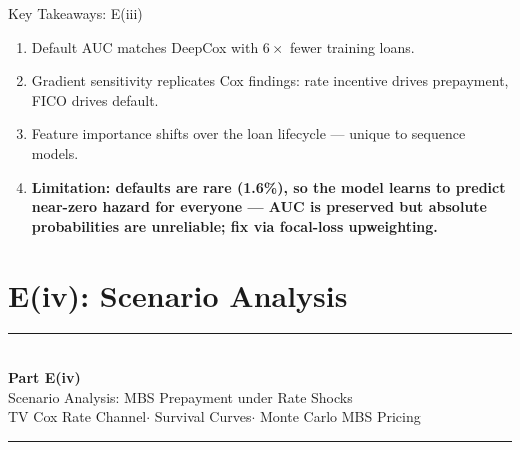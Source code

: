 \documentclass[10pt,aspectratio=169]{beamer}
\begin{document}
\begin{frame}{Key Takeaways: E(iii)}
    \begin{enumerate}\itemsep14pt
        \item Default AUC matches DeepCox with $6\times$ fewer training loans.
        \item Gradient sensitivity replicates Cox findings: rate incentive drives prepayment, FICO drives default.
        \item Feature importance shifts over the loan lifecycle --- unique to sequence models.
        \item \textbf{Limitation: defaults are rare (1.6\%), so the model learns to predict near-zero hazard for everyone --- AUC is preserved but absolute probabilities are unreliable; fix via focal-loss upweighting.}
    \end{enumerate}
\end{frame}

\section{E(iv): Scenario Analysis}

\begin{frame}
    \vfill
    \begin{center}
        {\color{accent}\rule{0.28\linewidth}{1.2pt}}\\[0.7em]
        {\Large\bfseries Part E(iv)}\\[0.5em]
        {\large Scenario Analysis: MBS Prepayment under Rate Shocks}\\[0.4em]
        {\small TV Cox Rate Channel\enspace$\cdot$\enspace
                Survival Curves\enspace$\cdot$\enspace
                Monte Carlo MBS Pricing}\\[0.7em]
        {\color{accent}\rule{0.28\linewidth}{1.2pt}}
    \end{center}
    \vfill
\end{frame}
\end{document}
